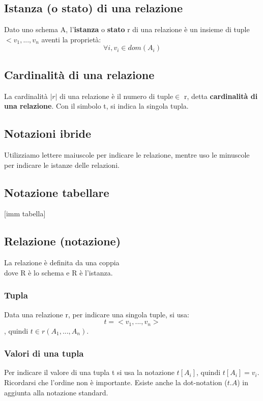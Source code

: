 \documentclass[10pt,twocolumn]{article}
\begin{document}
\subsection{Istanza (o stato) di una relazione}
Dato uno schema A, l'\textbf{istanza} o \textbf{stato} r di una relazione è un insieme di tuple $<v_1,...,v_n$ aventi la proprietà: \[\forall i, v_i \in dom (A_i)\]
\subsection{Cardinalità di una relazione}
La cardinalità $|r|$ di una relazione è il numero di tuple$\in$ r, detta \textbf{cardinalità di una relazione}. Con il simbolo t, si indica la singola tupla. 
\subsection{Notazioni ibride}
Utilizziamo lettere maiuscole per indicare le relazione, mentre uso le minuscole per indicare le istanze delle relazioni.
\subsection{Notazione tabellare}
[imm tabella]
\subsection{Relazione (notazione)}
La relazione è definita da una coppia \[<R,r>\] dove R è lo schema e R è l'istanza.
\subsubsection{Tupla}
Data una relazione r, per indicare una singola tuple, si usa: \[t=<v_1,...,v_n>\], quindi $t\in r(A_1,...,A_n)$.
\subsubsection{Valori di una tupla}
Per indicare il valore di una tupla t si usa la notazione $t[A_i]$, quindi $t[A_i]=v_i$. Ricordarsi che l'ordine non è importante. Esiste anche la dot-notation ($t.A$) in aggiunta alla notazione standard.
\end{document}
